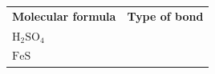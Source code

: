 \begin{enumerate}[noitemsep, label=\textbf{\arabic*}. ]
{        \begin{center}
      
      \label{m38694*id143418}
      
    \noindent
      \tablelasttail{}
      \begin{xtabular*}{\mytablewidth}[t]{|p{10\mystarwidth}|p{10\mystarwidth}|}\hline
    
    
        \textbf{Molecular formula} &
    
    
        \textbf{Type of bond}%
     \tabularnewline{}
    
    
        \begin{math}\mathrm{H}{}_{2}\mathrm{SO}{}_{4}\end{math} &
    
    
     \tabularnewline{}
    
    
        \begin{math}\mathrm{FeS}\end{math} &
    

\end{xtabular*}
\end{center}}
\end{enumerate}
